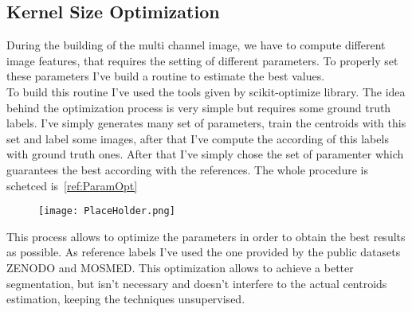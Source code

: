 \documentclass{standalone}
\begin{document}
	\subsection{Kernel Size Optimization}
	
	During the building of the multi channel image, we have to compute different image features, that requires the setting of different parameters.
	To properly set these parameters I've build a routine to estimate the best values.\\
	To build this routine I've used the tools given by scikit-optimize library. The idea behind the optimization process is very simple but requires some ground truth labels. I've simply generates many set of parameters, train the centroids with this set and label some images, after that I've compute the according of this labels with ground truth ones. After that I've simply chose the set of paramenter which guarantees the best according with the references. The whole procedure is schetced is \figurename\,\ref{ref:ParamOpt}
	
	\begin{figure}
		\centering
			\texttt{[image: PlaceHolder.png]}
			\label{fig:ParamOpt}\caption{} 
	\end{figure}

	This process allows to optimize the parameters in order to obtain the best results as possible. As reference labels I've used the one provided by the public datasets ZENODO and MOSMED. This optimization allows to achieve a better segmentation, but isn't necessary and doesn't interfere to the actual centroids estimation, keeping the techniques unsupervised.
\end{document}
